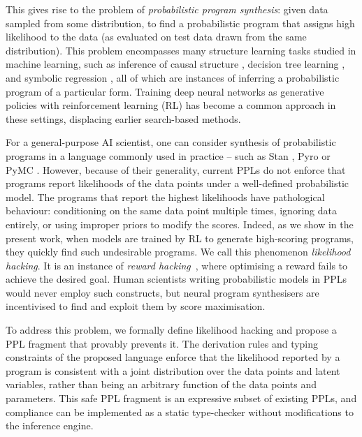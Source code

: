 \documentclass[preprint]{uai2026} %
\begin{document}
This gives rise to the problem of \emph{probabilistic program synthesis}: given data sampled from some distribution, to find a probabilistic program that assigns high likelihood to the data (as evaluated on test data drawn from the same distribution). This problem encompasses many structure learning tasks studied in machine learning, such as inference of causal structure \citep{pearlCausality2009}, decision tree learning \citep[e.g.,][]{quinlanInductionDecisionTrees1986}, and symbolic regression \citep[e.g.,][]{boussifBayesianSymbolicRegression2025}, all of which are instances of inferring a probabilistic program of a particular form. Training deep neural networks as generative policies with reinforcement learning (RL) has become a common approach in these settings, displacing earlier search-based methods.

For a general-purpose AI scientist, one can consider synthesis of probabilistic programs in a language commonly used in practice -- such as Stan \citep{standevelopmentteamStanReferenceManual2025}, Pyro \citep{bingham2019pyro} or PyMC \citep{Abril-Pla_PyMC_a_modern_2023}. However, because of their generality, current PPLs do not enforce that programs report likelihoods of the data points under a well-defined probabilistic model. The programs that report the highest likelihoods have pathological behaviour: conditioning on the same data point multiple times, ignoring data entirely, or using improper priors to modify the scores. Indeed, as we show in the present work, when models are trained by RL to generate high-scoring programs, they quickly find such undesirable programs. We call this phenomenon \emph{likelihood hacking}. It is an instance of \emph{reward hacking}~\citep{skalseDefiningCharacterizingReward2025}, where optimising a reward fails to achieve the desired goal. Human scientists writing probabilistic models in PPLs would never employ such constructs, but neural program synthesisers are incentivised to find and exploit them by score maximisation.

To address this problem, we formally define likelihood hacking and propose a PPL fragment that provably prevents it. The derivation rules and typing constraints of the proposed language enforce that the likelihood reported by a program is consistent with a joint distribution over the data points and latent variables, rather than being an arbitrary function of the data points and parameters. This safe PPL fragment is an expressive subset of existing PPLs, and compliance can be implemented as a static type-checker without modifications to the inference engine.
\end{document}

